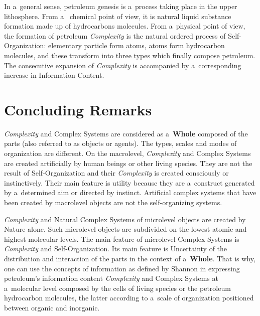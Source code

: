 \begin{multicols}{2}
In a~general sense, petroleum genesis is a~process taking place in the upper lithosphere. From a~
chemical point of view, it is natural liquid substance formation made up of hydrocarbons 
molecules. From a~physical point of view, the formation of petroleum \textit{Complexity} is the 
natural ordered process of Self-Organization: elementary particle form atoms, atoms form 
hydrocarbon molecules, and these transform into three types which finally compose petroleum. 
The consecutive expansion of \textit{Complexity} is accompanied by a~corresponding increase in 
Information Content. 

\section*{Concluding Remarks}

\noindent
\textit{Complexity} and Complex Systems are considered as a~\textbf{Whole} composed of the 
parts (also referred to as objects or agents). The types, scales and modes of organization are 
different. On the macrolevel, \textit{Complexity} and Complex Systems are created artificially 
by human beings or other living species. They are not the result of Self-Organization and their 
\textit{Complexity} is created consciously or instinctively. Their main feature is utility because 
they are a~construct generated by a~determined aim or directed by instinct. Artificial complex 
systems that have been created by macrolevel objects are not the self-organizing systems. 

\textit{Complexity} and Natural Complex Systems of microlevel objects are created by Nature 
alone. Such microlevel objects are subdivided on the lowest atomic and highest molecular 
levels. The main feature of microlevel Complex Systems is \textit{Complexity} and 
Self-Organization. Its main feature is Uncertainty of the distribution and interaction of the parts in the 
context of a~\textbf{Whole}. That is why, one can use the concepts of information as defined by 
Shannon in expressing petroleum's information content \textit{Complexity} and Complex 
Systems at a~molecular level composed by the cells of living species or the petroleum 
hydrocarbon molecules, the latter according to a~scale of organization positioned between 
organic and inorganic.


\end{multicols}
